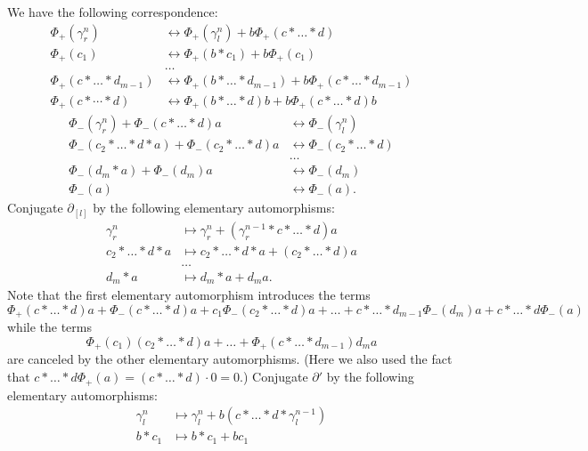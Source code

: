 \documentclass[11pt]{amsart}
\makeatletter
\renewenvironment{proof}[1][\proofname] {\par\pushQED{\qed}{\normalfont\bfseries\topsep6\p@\@plus6\p@\relax #1\@addpunct{.} }}{\popQED\endtrivlist\@endpefalse}
\theoremstyle{mystyle}
\newcommand{\<}{\langle}
\renewcommand{\>}{\rangle}
\makeatother
\begin{document}
\begin{proof}
    We have the following correspondence: \begin{align*}
        \Phi_+(\gamma_r^n) &\leftrightarrow \Phi_+(\gamma_l^n) + b\Phi_+(c * \dots * d) \\
        \Phi_+(c_1) &\leftrightarrow \Phi_+(b * c_1) + b\Phi_+(c_1) \\
        &\dots \\
        \Phi_+(c * \dots * d_{m-1}) &\leftrightarrow \Phi_+(b * \dots * d_{m-1}) + b\Phi_+(c * \dots * d_{m-1}) \\
        \Phi_+(c * \cdots * d) &\leftrightarrow \Phi_+(b * \dots * d)b + b \Phi_+(c * \dots * d) b
    \end{align*} \begin{align*}
        \Phi_-(\gamma_r^n) + \Phi_-(c * \dots * d) a &\leftrightarrow \Phi_-(\gamma_l^n) \\
        \Phi_-(c_2 * \dots * d * a) + \Phi_-(c_2 * \dots * d)a &\leftrightarrow \Phi_-(c_2 * \dots * d) \\
        &\dots \\
        \Phi_-(d_m * a) + \Phi_-(d_m)a &\leftrightarrow \Phi_-(d_m) \\
        \Phi_-(a) &\leftrightarrow \Phi_-(a).
    \end{align*} Conjugate $\partial_{[l]}$ by the following elementary automorphisms: \begin{align*}
        \gamma_r^n &\mapsto \gamma_r^n + (\gamma_r^{n-1} * c * \dots * d) a \\
        c_2 * \dots * d * a &\mapsto c_2 * \dots * d * a + (c_2 * \dots * d) a \\
        &\dots \\
        d_m * a &\mapsto d_m * a + d_m a.
    \end{align*} Note that the first elementary automorphism introduces the terms \[\Phi_+(c * \dots * d)a + \Phi_-(c * \dots * d)a + c_1 \Phi_-(c_2 * \dots * d)a + \dots + c * \dots * d_{m-1} \Phi_-(d_m)a + c * \dots * d \Phi_-(a)\] while the terms \[\Phi_+(c_1) (c_2 * \dots * d) a + \dots + \Phi_+(c * \dots * d_{m-1})d_m a\] are canceled by the other elementary automorphisms. (Here we also used the fact that $c * \dots * d \Phi_+(a) = (c * \dots * d) \cdot 0 = 0$.) Conjugate $\partial'$ by the following elementary automorphisms: \begin{align*}
        \gamma_l^n &\mapsto \gamma_l^n + b (c * \dots * d * \gamma_l^{n-1}) \\
        b * c_1 &\mapsto b * c_1 + bc_1 \\

\end{align*}
\end{proof}
\end{document}
